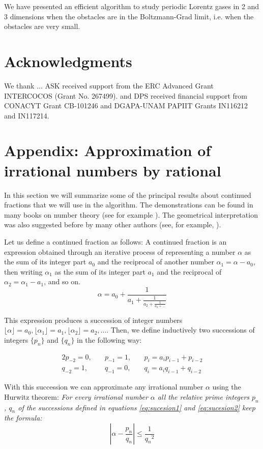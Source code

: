 \documentclass[prl,amsmath,amssymb, twocolumn, showpacs]{revtex4-1}
\begin{document}
We have presented an efficient algorithm to study periodic Lorentz gases in 2 and 3 dimensions when the obstacles are in the Boltzmann-Grad limit, i.e. when the obstacles are very small. 

\section{Acknowledgments}  
We thank ... ASK received support from the ERC Advanced Grant
INTERCOCOS (Grant No. 267499). and DPS received financial support from CONACYT Grant CB-101246 and DGAPA-UNAM PAPIIT Grants
IN116212 and IN117214.


\section{Appendix: Approximation of irrational numbers by rational}

In this section we will summarize some of the principal results about continued fractions that we will use in the algorithm. The demonstrations can be found in many books on number theory (see for example \cite{niven2008introduction}). The geometrical interpretation was also suggested before by many other authors (see, for example, \cite{nogueira1995three}). 

Let us define a continued fraction as follows:
A continued fraction is an expression obtained through an iterative process of representing a number $\alpha$ as the sum of its integer part $a_0$ and the reciprocal of another number $\alpha_1=\alpha-a_0$, then writing $\alpha_1$ as the sum of its integer part $a_1$ and the reciprocal of $\alpha_2=\alpha_1-a_1$, and so on. 
\begin{equation*}
  \alpha = a_0 + \frac{1}{\displaystyle a_1
          + \frac{1}{\displaystyle a_2
          + \frac{1}{\displaystyle a_3 + \dots}}}
\end{equation*}

This expression produces a succession of integer numbers $\lfloor \alpha \rfloor=a_0,\lfloor \alpha_1 \rfloor=a_1, \lfloor \alpha_2 \rfloor=a_2, \dots$. 
Then, we define inductively two successions of integers $\{ p_n\}$ and $\{ q_n\}$ in the following way:

\begin{alignat}{2}
p_{-2} = 0,  &\quad p_{-1} = 1,  &\quad p_i=a_i p_{i-1}+p_{i-2}
\label{eq:sucesion1}
\\ 
q_{-2} = 1,  &\quad q_{-1} = 0,  &\quad q_i=a_i q_{i-1}+q_{i-2} 
\label{eq:sucesion2}
\end{alignat}

With this succession we can approximate any irrational number $\alpha$ using the Hurwitz theorem:
\emph{For every irrational number $\alpha$ all the relative prime integers $p_n$, $q_n$ of the successions defined in equations \ref{eq:sucesion1} and \ref{eq:sucesion2} keep the formula:}
\begin{equation}
|\alpha- \frac{p_n}{q_n}|\leq  \frac{1}{{q_n}^2} 
\end{equation}




\end{document}
